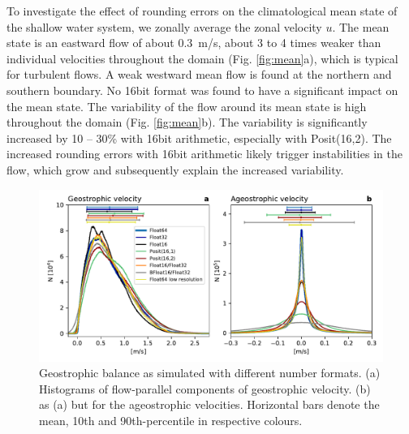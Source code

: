 \documentclass[draft]{agujournal2019}
\begin{document}
To investigate the effect of rounding errors on the climatological mean state of the shallow water system, we zonally average the zonal velocity $u$. The mean state is an eastward flow of about 0.3~m/s, about 3 to 4 times weaker than individual velocities throughout the domain (Fig. \ref{fig:mean}a), which is typical for turbulent flows. A weak westward mean flow is found at the northern and southern boundary. No 16bit format was found to have a significant impact on the mean state. The variability of the flow around its mean state is high throughout the domain (Fig. \ref{fig:mean}b). The variability is significantly increased by 10 -- 30\% with 16bit arithmetic, especially with Posit(16,2). The increased rounding errors with 16bit arithmetic likely trigger instabilities in the flow, which grow and subsequently explain the increased variability.

\begin{figure}
\includegraphics[width=1\textwidth]{../plots/ageostrophic.pdf}
\caption{Geostrophic balance as simulated with different number formats. (a) Histograms of flow-parallel components of geostrophic velocity. (b) as (a) but for the ageostrophic velocities. Horizontal bars denote the mean, 10th and 90th-percentile in respective colours.}
\label{fig:geo}
\end{figure}
\end{document}
